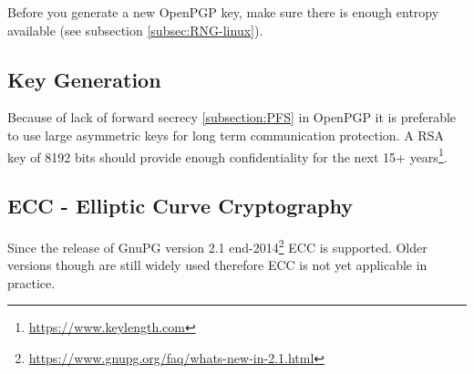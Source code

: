
Before you generate a new OpenPGP key, make sure there is enough entropy available (see subsection \ref{subsec:RNG-linux}).

\subsection{Key Generation}
\gdef\currentsectionname{GPG}
\gdef\currentsubsectionname{GnuPG}
Because of lack of forward secrecy \ref{subsection:PFS} in OpenPGP it is preferable to use large asymmetric keys for long term
communication protection. A RSA key of 8192 bits should provide enough confidentiality for the next 15+ years\footnote{\url{https://www.keylength.com}}.



\subsection{ECC - Elliptic Curve Cryptography}
Since the release of GnuPG version 2.1 end-2014\footnote{\url{https://www.gnupg.org/faq/whats-new-in-2.1.html}} ECC is supported. Older versions though are still widely used therefore ECC is not yet applicable in practice. 












